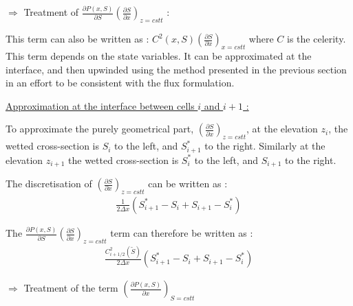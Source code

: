 \vspace{0.5cm}

$\Longrightarrow$ Treatment of $\frac{\partial P(x,S)}{\partial S}\left ( \frac{\partial S}{\partial x}\right )_{z=cstt}$ :

\vspace{0.5cm}

This term can also be written as : $C^2 (x,S)\left ( \frac{\partial S}{\partial x}\right )_{x=cstt}$ where $C$ is the celerity. This term depends on the state variables. It can be approximated at the interface, and then upwinded using the method presented in the previous section in an effort to be consistent with the flux formulation.

\vspace{0.5cm}

\underline{Approximation at the interface between cells $i$ and $i+1$ :}

\vspace{0.5cm}

To approximate the purely geometrical part, $\left ( \frac{\partial S}{\partial x}\right )_{z=cstt}$, at the elevation $z_i$, the wetted cross-section is $S_i$ to the left, and $S^{*}_{i+1}$ to the right. Similarly at the elevation $z_{i+1}$ the wetted cross-section is $S^{*}_i$ to the left, and $S_{i+1}$ to the right.

\vspace{0.5cm}

The discretisation of $\left ( \frac{\partial S}{\partial x}\right )_{z=cstt}$ can be written as :
\begin{eqnarray}
 & \frac{1}{2 \Delta x} \left ( S_{i+1}^* -S_i +S_{i+1} - S_{i}^* \right ) & \nonumber
\end{eqnarray}

\vspace{0.5cm}

The $\frac{\partial P(x,S)}{\partial S}\left ( \frac{\partial S}{\partial x}\right )_{z=cstt}$ term can therefore be written as :
\begin{eqnarray}
 & \frac{C_{i+1/2}^2 (\tilde{S})}{2 \Delta x} \left ( S_{i+1}^* -S_i +S_{i+1} - S_{i}^* \right ) & \nonumber
\end{eqnarray}

\vspace{0.5cm}

$\Longrightarrow$ Treatment of the term $\left ( \frac{\partial P(x,S)}{\partial x} \right )_{S=cstt}$

\vspace{0.5cm}

